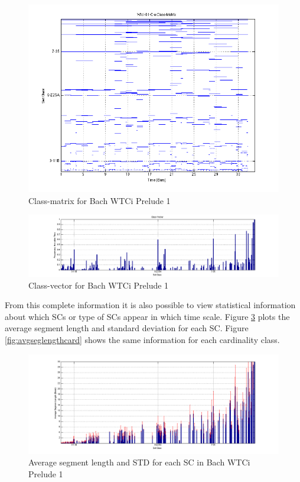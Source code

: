 \documentclass{article}
\begin{document}
\begin{figure}[htb]
\centering
\includegraphics[scale=0.3]{../plots/classmat.png}
\caption{\label{fig:classmat}Class-matrix for Bach WTCi Prelude 1}
\end{figure}
\begin{figure}[htb]
\centering
\includegraphics[scale=0.3]{../plots/classvec.png}
\caption{\label{fig:classvec}Class-vector for Bach WTCi Prelude 1}
\end{figure}

From this complete information it is also possible to view statistical
information about which SCs or type of SCs appear in which time
scale. Figure \ref{fig:avgseglengthsc} plots the average segment
length and standard deviation for each SC. Figure
\ref{fig:avgseglengthcard} shows the same information for each
cardinality class.

\begin{figure}[htb]
\centering
\includegraphics[scale=0.25]{../plots/avgseglengthsc.png}
\caption{\label{fig:avgseglengthsc}Average segment length and STD for each SC in Bach WTCi Prelude 1}
\end{figure}
\end{document}

